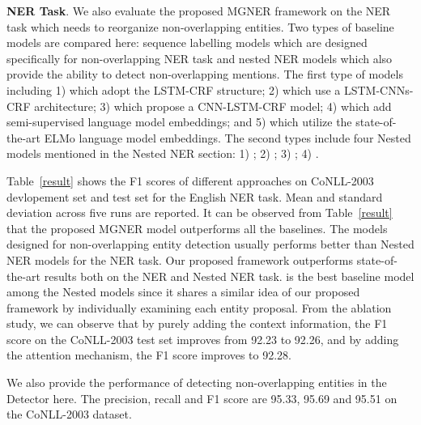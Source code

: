 \documentclass[11pt,a4paper]{article}
\newcommand{\ModelName}{\textsc{MGNER}}
\begin{document}
{\bf NER Task}. We also evaluate the proposed {\ModelName} framework on the NER task which needs to reorganize non-overlapping entities. Two types of baseline models are compared here: sequence labelling models which are designed specifically for non-overlapping NER task and nested NER models which also provide the ability to detect non-overlapping mentions. The first type of models including 1) \citet{lample2016neural} which adopt the LSTM-CRF structure; 2) \citet{ma2016end} which use a LSTM-CNNs-CRF architecture; 3) \citet{chiu2016named} which propose a CNN-LSTM-CRF model; 4) \citet{peters2017semi} which add semi-supervised language model embeddings; and 5) \citet{peters2018deep} which utilize the state-of-the-art ELMo language model embeddings. The second types include four Nested models mentioned in the Nested NER section: 1) \citet{luo2015joint}; 2) \citet{lu2017mention}; 3) \citet{xu2017local}; 4) \cite{wang2018neural}.

Table~\ref{result} shows the F1 scores of different approaches on CoNLL-2003 devlopement set and test set for the English NER task. Mean and standard deviation across five runs are reported.
It can be observed from Table~\ref{result} that the proposed {\ModelName} model outperforms all the baselines. The models designed for non-overlapping entity detection usually performs better than Nested NER models for the NER task. Our proposed framework outperforms state-of-the-art results both on the NER and Nested NER task. \citet{xu2017local} is the best baseline model among the Nested models since it shares a similar idea of our proposed framework by individually examining each entity proposal.
From the ablation study, we can observe that by purely adding the context information, the F1 score on the CoNLL-2003 test set improves from 92.23 to 92.26, and by adding the attention mechanism, the F1 score improves to 92.28. 

We also provide the performance of detecting non-overlapping entities in the Detector here. The precision, recall and F1 score are 95.33, 95.69 and 95.51 on the CoNLL-2003 dataset. \vspace{-2mm}
\end{document}
